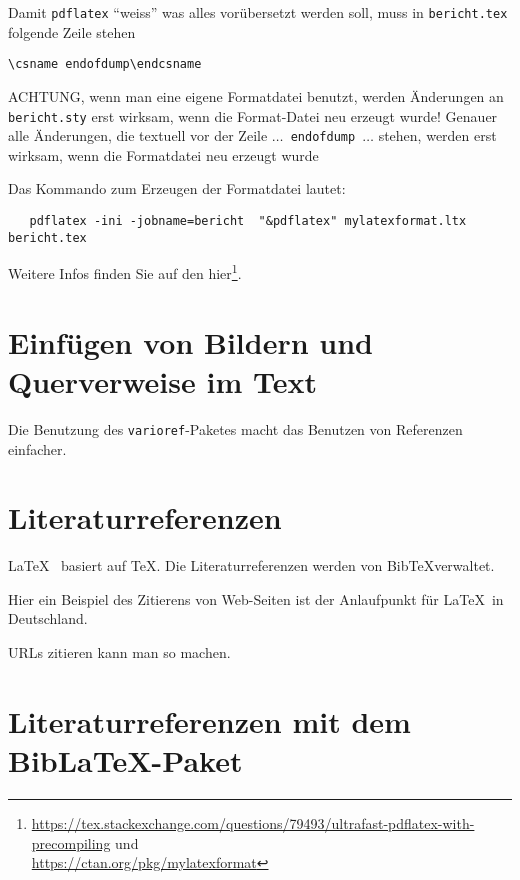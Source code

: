 Damit \texttt{pdflatex} \enquote{weiss} was alles vorübersetzt werden soll, muss in
\texttt{bericht.tex} folgende Zeile stehen
\begin{verbatim}
\csname endofdump\endcsname
\end{verbatim}
ACHTUNG, wenn man eine eigene Formatdatei benutzt, werden Änderungen an \texttt{bericht.sty}
erst wirksam, wenn die Format-Datei neu erzeugt wurde!
Genauer alle Änderungen, die textuell vor  der Zeile \texttt{$\dots$ endofdump $\dots$} stehen,
werden erst wirksam, wenn die Formatdatei neu erzeugt wurde

Das Kommando zum Erzeugen der Formatdatei lautet:
\begin{verbatim}
   pdflatex -ini -jobname=bericht  "&pdflatex" mylatexformat.ltx bericht.tex
\end{verbatim}
Weitere Infos finden Sie auf den hier\footnote{
\url{https://tex.stackexchange.com/questions/79493/ultrafast-pdflatex-with-precompiling} und\\
\url{https://ctan.org/pkg/mylatexformat}}.


\section{Einfügen von Bildern und Querverweise im Text}



Die Benutzung des \texttt{varioref}-Paketes macht das Benutzen von Referenzen einfacher.


\section{Literaturreferenzen}

\LaTeX\ \cite{lamport.1995a} basiert auf \TeX \cite{knuth.1984a}.
Die Literaturreferenzen werden von Bib\TeX verwaltet.

Hier ein Beispiel des Zitierens von Web-Seiten
\cite{dante.2010a} ist der Anlaufpunkt für \LaTeX\ in Deutschland.

URLs zitieren kann man so \cite{dante.2010a} machen.

\section{Literaturreferenzen mit dem Bib\LaTeX-Paket}

